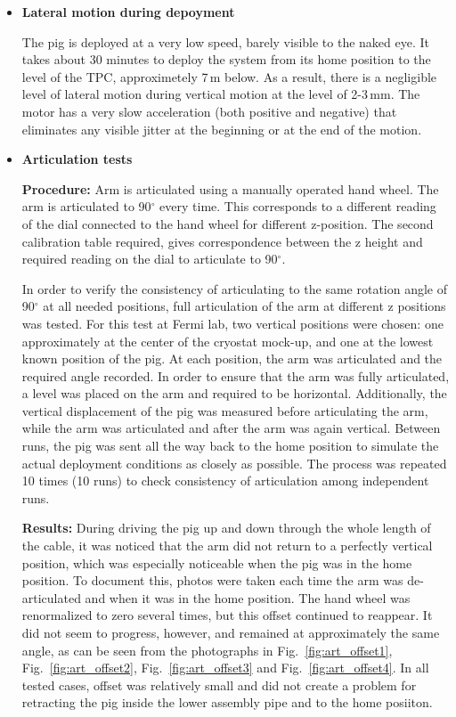 \begin{itemize}
\item{\bf Lateral motion during depoyment}

The pig is deployed at a very low speed, barely visible to the naked eye. It takes about 30 minutes to deploy the system from its home position to the level of the TPC, approximetely 7\,m below. As a result, there is a negligible level of lateral motion during vertical motion at the level of 2-3\,mm. The motor has a very slow acceleration (both positive and negative) that eliminates any visible jitter at the beginning or at the end of the motion.

\item{\bf Articulation tests}

{\bf Procedure:} Arm is articulated using a manually operated hand wheel.  The arm is articulated to 90$^{\circ}$ every time. This corresponds to a different reading of the dial connected to the hand wheel for different z-position. The second calibration table required, gives correspondence between the z height and required reading on the dial to articulate to 90$^{\circ}$. 

In order to verify the consistency of articulating to the same rotation angle of 90$^{\circ}$ at all needed positions,  full articulation of the arm at different z positions was tested. For this test at Fermi lab, two vertical positions were chosen: one approximately at the center of the cryostat mock-up, and one at the lowest known position of the pig. At each position, the arm was articulated and
the required angle recorded. In order to ensure that the arm was fully articulated, a level was placed on the
arm and required to be horizontal. Additionally, the vertical displacement of the pig was measured before articulating the arm, while the arm was articulated and after the arm was again vertical. Between runs, the
pig was sent all the way back to the home position to simulate the actual deployment conditions as closely as possible. The process was repeated 10 times  (10 runs) to check consistency of articulation among independent runs.

{\bf Results:} During driving the pig up and down through the whole length of the cable, it was noticed that the arm did not return to a perfectly vertical position, which was especially noticeable when the pig was in the home position. To document this, photos were taken each time the arm was de-articulated and when it was in the home position. The hand wheel was renormalized to zero several times, but this offset continued to reappear. It did not seem to progress, however, and remained at approximately the same angle, as can be seen from the photographs in Fig.~\ref{fig:art_offset1}, Fig.~\ref{fig:art_offset2}, Fig.~\ref{fig:art_offset3} and Fig.~\ref{fig:art_offset4}. In all tested cases, offset was relatively small and did not create a problem for retracting the pig inside the lower assembly pipe and to the home posiiton. 


\end{itemize}
